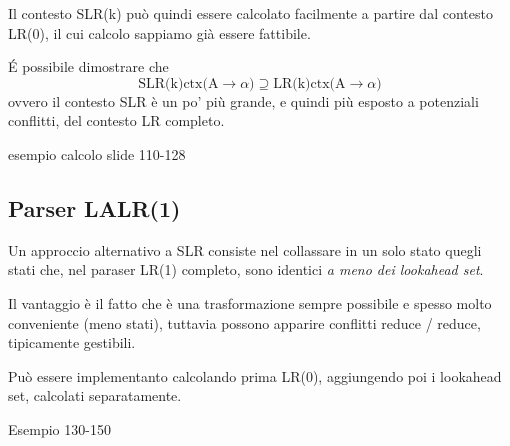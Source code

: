 Il contesto SLR(k) può quindi essere calcolato facilmente a partire dal contesto LR(0), il cui calcolo sappiamo già essere fattibile.

\begin{mdframed}[topline=false,bottomline=false,rightline=false]
É possibile dimostrare che 
\begin{equation*}
    \text{SLR(k)ctx(A} \rightarrow \alpha ) \supseteq \text{LR(k)ctx(A} \rightarrow \alpha)
\end{equation*}
ovvero il contesto SLR è un po' più grande, e quindi più esposto a potenziali conflitti, del contesto LR completo.
\end{mdframed}

esempio calcolo slide 110-128

\subsection{Parser LALR(1)}
Un approccio alternativo a SLR consiste nel collassare in un solo stato quegli stati che, nel paraser LR(1) completo, sono identici \textit{a meno dei lookahead set}.

Il vantaggio è il fatto che è una trasformazione sempre possibile e spesso molto conveniente (meno stati), tuttavia possono apparire conflitti reduce / reduce, tipicamente gestibili.

Può essere implementanto calcolando prima LR(0), aggiungendo poi i lookahead set, calcolati separatamente.

Esempio 130-150










































